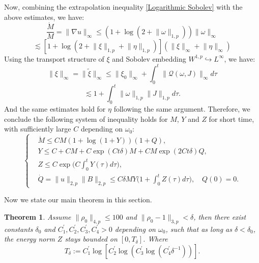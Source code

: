 \documentclass[12pt,letterpaper]{article}
\newtheorem{thm}{Theorem}[section]
\theoremstyle{plain}
\begin{document}
Now, combining the extrapolation inequality \eqref{Logarithmic Sobolev} with the above estimates, we have:
\begin{equation*}
 \frac{\dot M}{M} =\lVert\nabla u\rVert_\infty\le (1+\log(2+\lVert\omega\rVert_{1,p}))\lVert\omega\rVert_\infty  
\end{equation*}
\begin{equation*}
 \lesssim    [1+\log(2+\lVert\xi\rVert_{1,p}+\lVert\eta\rVert_{1,p})](\lVert\xi\rVert_{\infty}+\lVert\eta\rVert_\infty)
\end{equation*}
Using the transport structure of $\xi$ and Sobolev embedding $W^{1,p}\hookrightarrow L^\infty$, we have:
\begin{equation*}
\lVert \xi\rVert_\infty=\lVert\tilde\xi\rVert_\infty\le \lVert\xi_0\rVert_\infty+\int_0^t \lVert\mathscr Q(\omega,J)\rVert_\infty d\tau   
\end{equation*}
\begin{equation}\label{Linfty Estimate for xi}
 \lesssim 1+ \int_0^t \lVert\omega\rVert_{1,p} \lVert J\rVert_{1,p}d\tau.
\end{equation}
And the same estimates hold for $\eta$ following the same argument. Therefore, we conclude the following system of inequality holds for $M$, $Y$ and $Z$ for short time, with sufficiently large $C$ depending on $\omega_0$:
\begin{equation}\label{Differential Inequality System MHD}
\left\{
\begin{aligned}
&\dot M\le  CM(1+\log (1+Y))(1+Q),\\
&Y\le  C+CM+C\exp(Ct\delta)M+ C M\exp(2Ct\delta)Q,\\
&Z\le C\exp\bigg(C\int_0^t Y(\tau)d\tau\bigg),\\
& \dot Q=\lVert u\rVert_{2,p}\lVert B\rVert_{2,p}\le C\delta MY\bigg(1+\int_0^t Z(\tau)d\tau\bigg),\quad Q(0)=0.
\end{aligned}
\right.    
\end{equation}

Now we state our main theorem in this section.
\begin{thm}\label{Lifespan of MHD}
 Assume $\lVert\rho_0\lVert_{4,p}\le 100$ and $\lVert\rho_0-1\rVert_{3,p}<\delta$, then there exist constants $\delta_0$ and $C_1^\prime,C_2^\prime,C_3^\prime,C_4^\prime>0$ depending on $\omega_0$, such that as long as $\delta<\delta_0$, the energy norm $Z$ stays bounded on $[0,T_\delta]$. Where
\begin{equation}\label{Time of Existence of MHD}
 T_\delta:=C_1^\prime\log [C_2^\prime\log (C_3^\prime\log( C_4^\prime \delta^{-1}))].   
\end{equation}
\end{thm}
\end{document}
